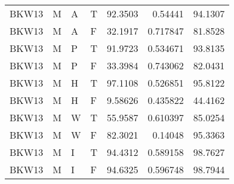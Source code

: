 \begin{longtable}{llllrrr}
    BKW13    & M     & A     & T          & 92.3503    & 0.54441     & 94.1307  \\
    BKW13    & M     & A     & F          & 32.1917    & 0.717847    & 81.8528  \\
    BKW13    & M     & P     & T          & 91.9723    & 0.534671    & 93.8135  \\
    BKW13    & M     & P     & F          & 33.3984    & 0.743062    & 82.0431  \\
    BKW13    & M     & H     & T          & 97.1108    & 0.526851    & 95.8122  \\
    BKW13    & M     & H     & F          & 9.58626    & 0.435822    & 44.4162  \\
    BKW13    & M     & W     & T          & 55.9587    & 0.610397    & 85.0254  \\
    BKW13    & M     & W     & F          & 82.3021    & 0.14048     & 95.3363  \\
    BKW13    & M     & I     & T          & 94.4312    & 0.589158    & 98.7627  \\
    BKW13    & M     & I     & F          & 94.6325    & 0.596748    & 98.7944  \\
    \hline
\end{longtable}
